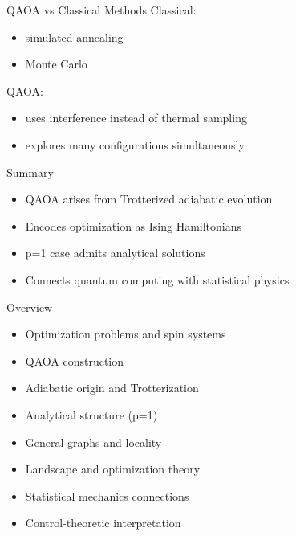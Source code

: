 \documentclass{beamer}
\begin{document}
\begin{frame}{QAOA vs Classical Methods}
Classical:
\begin{itemize}
\item simulated annealing
\item Monte Carlo
\end{itemize}

QAOA:
\begin{itemize}
\item uses interference instead of thermal sampling
\item explores many configurations simultaneously
\end{itemize}
\end{frame}

\begin{frame}{Summary}
\begin{itemize}
\item QAOA arises from Trotterized adiabatic evolution
\item Encodes optimization as Ising Hamiltonians
\item p=1 case admits analytical solutions
\item Connects quantum computing with statistical physics
\end{itemize}
\end{frame}


\frame{\titlepage}

\begin{frame}{Overview}
\begin{itemize}
\item Optimization problems and spin systems
\item QAOA construction
\item Adiabatic origin and Trotterization
\item Analytical structure (p=1)
\item General graphs and locality
\item Landscape and optimization theory
\item Statistical mechanics connections
\item Control-theoretic interpretation
\end{itemize}
\end{frame}
\end{document}
